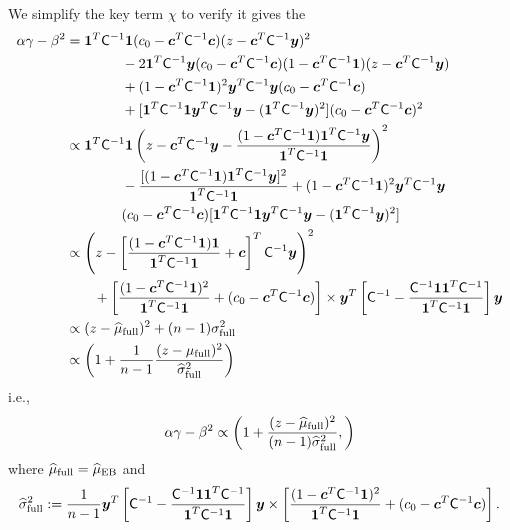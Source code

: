 \documentclass{iitthesis}          %
\newcommand{\bm}[1]{\boldsymbol{#1}}
\newcommand{\vc}{\bm{c}}
\newcommand{\vy}{\bm{y}}
\newcommand{\vone}{\bm{1}}
\newcommand{\mC}{\mathsf{C}}
\newcommand{\hmu}{\widehat{\mu}}
\newcommand{\hsigma}{\widehat{\sigma}}
\newcommand{\MLE}{\textup{EB}}
\begin{document}
\iffalse
We simplify the key term $\chi$ to verify it gives the 
\begin{align*}
\alpha \gamma - \beta^2 
& = \vone^T \mC^{-1} \vone (c_0  -\vc ^T \mC^{-1} \vc) (z - \vc^T \mC^{-1} \vy )^2 \\
& \qquad \qquad - 2 \vone^T \mC^{-1} \vy (c_0  -\vc ^T \mC^{-1} \vc)(1 - \vc^T \mC^{-1} \vone)(z - \vc^T \mC^{-1} \vy ) \\
& \qquad \qquad + (1 - \vc^T \mC^{-1} \vone)^2 \vy^T \mC^{-1} \vy (c_0  -\vc ^T \mC^{-1} \vc) \\
&\qquad \qquad  + [\vone^T \mC^{-1} \vone \vy^T \mC^{-1} \vy - (\vone^T \mC^{-1} \vy)^2](c_0  -\vc ^T \mC^{-1} \vc)^2  \\
& \propto \vone^T \mC^{-1} \vone  \left (z - \vc^T \mC^{-1} \vy - \frac{(1 - \vc^T \mC^{-1} \vone)\vone^T \mC^{-1} \vy}{\vone^T \mC^{-1} \vone } \right )^2 \\
& \qquad \qquad -  \frac{[(1 - \vc^T \mC^{-1} \vone)\vone^T \mC^{-1} \vy]^2}{\vone^T \mC^{-1} \vone }  
+ (1 - \vc^T \mC^{-1} \vone)^2 \vy^T \mC^{-1} \vy \\
& \qquad \qquad (c_0  -\vc ^T \mC^{-1} \vc) [\vone^T \mC^{-1} \vone  \vy^T \mC^{-1} \vy
- (\vone^T \mC^{-1} \vy)^2] \\
& \propto \left (z - \left[ \frac{(1 - \vc^T \mC^{-1} \vone)\vone}{\vone^T \mC^{-1} \vone } + \vc \right]^T \mC^{-1} \vy \right )^2 \\
& \qquad  + \left[\frac{(1 - \vc^T \mC^{-1} \vone)^2}{\vone^T \mC^{-1} \vone} + (c_0  -\vc ^T \mC^{-1} \vc) \right] \times \vy^T\left[ \mC^{-1} 
- \frac{ \mC^{-1} \vone\vone^T \mC^{-1}}{\vone^T \mC^{-1} \vone}  \right]\vy
\\
& \propto (z - \widehat{\mu}_{\textup{full}})^2 + (n-1) \sigma_{\textup{full}}^2
\\
& \propto \left(1 +  \frac{1}{n-1} \frac{(z - \mu_{\textup{full}})^2}{\widehat{\sigma}_{\textup{full}}^2} \right)
\end{align*}
i.e.,
\begin{align*}
\alpha \gamma - \beta^2 \propto 
\left(
1 +  \frac{(z - \hmu_{\textup{full}})^2}{(n-1)\widehat{\sigma}_{\textup{full}}^2}, 
\right)
\end{align*}
where $\hmu_{\textup{full}} = \hmu_{\MLE}$ and 
\begin{multline*}
\hsigma^2_{\textup{full}} 
:= \frac{1}{n-1}
\vy^T\left[ \mC^{-1} 
- \frac{ \mC^{-1} \vone\vone^T \mC^{-1}}{\vone^T \mC^{-1} \vone}  \right]\vy
\times  \left[\frac{(1 - \vc^T \mC^{-1} \vone)^2}{\vone^T \mC^{-1} \vone} + (c_0  -\vc ^T \mC^{-1} \vc) \right].
\end{multline*}
\end{document}
